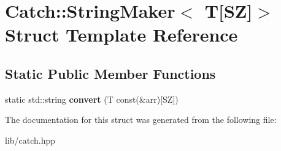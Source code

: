 \hypertarget{struct_catch_1_1_string_maker_3_01_t[_s_z]_4}{}\section{Catch\+:\+:String\+Maker$<$ T\mbox{[}SZ\mbox{]}$>$ Struct Template Reference}
\label{struct_catch_1_1_string_maker_3_01_t[_s_z]_4}
\subsection*{Static Public Member Functions}
\begin{DoxyCompactItemize}
\item 
\mbox{\label{struct_catch_1_1_string_maker_3_01_t[_s_z]_4_a3698cea2c24d8649ec9ecb5fa679eeb7}} 
static std\+::string {\bfseries convert} (T const(\&arr)\mbox{[}SZ\mbox{]})
\end{DoxyCompactItemize}


The documentation for this struct was generated from the following file\+:\begin{DoxyCompactItemize}
\item 
lib/catch.\+hpp\end{DoxyCompactItemize}
